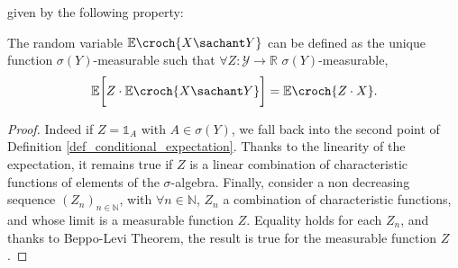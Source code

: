 given by  the following property:
\begin{Property}
\label{prop_def_condexpec}
The random variable $\mathbb{E} \croch{ X \sachant Y }$ can be defined as
the unique function $\sigma(Y)$-measurable such that
$\forall Z: \mathcal{Y} \rightarrow \mathbb{R}$ $\sigma(Y)$-measurable, 
\[ \mathbb{E} \bigg[ Z \cdot \mathbb{E} \croch{ X \sachant Y } \bigg] = \mathbb{E} \croch{Z \cdot X}. \]
\end{Property}
\begin{proof}
Indeed if $Z = \mathds{1}_{A}$ with $A \in \sigma(Y)$, 
we fall back into the second point of Definition \ref{def_conditional_expectation}. 
Thanks to the linearity of the expectation, 
it remains true if $Z$ 
is a linear combination of characteristic functions of
elements of the $\sigma$-algebra.
Finally, consider a non decreasing sequence $(Z_n)_{n \in \mathbb{N}}$,
with $\forall n \in \mathbb{N}$, $Z_n$ a combination of characteristic functions,
and whose limit is a measurable function $Z$.
Equality holds for each $Z_n$, and thanks to Beppo-Levi Theorem,
the result is true for the measurable function $Z$. 
\end{proof}

